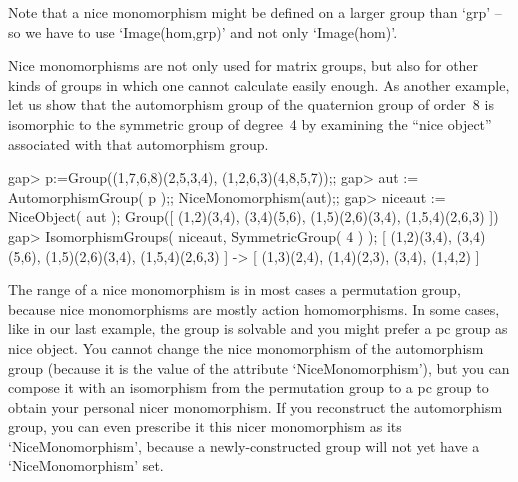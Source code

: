 Note that a nice monomorphism might be defined on a larger group than `grp'
-- so we have to use `Image(hom,grp)' and not only `Image(hom)'.

%

Nice monomorphisms are not only used for matrix groups, but also for
other kinds of groups in which one cannot calculate easily enough. As
another example, let us show that the automorphism group of the
quaternion group of order~8 is isomorphic to the symmetric group of
degree~4  by examining the ``nice object'' associated with that
automorphism group.

\beginexample
gap> p:=Group((1,7,6,8)(2,5,3,4), (1,2,6,3)(4,8,5,7));;
gap> aut := AutomorphismGroup( p );; NiceMonomorphism(aut);;
gap> niceaut := NiceObject( aut );
Group([ (1,2)(3,4), (3,4)(5,6), (1,5)(2,6)(3,4), (1,5,4)(2,6,3) ])
gap> IsomorphismGroups( niceaut, SymmetricGroup( 4 ) );
[ (1,2)(3,4), (3,4)(5,6), (1,5)(2,6)(3,4), (1,5,4)(2,6,3) ] -> 
[ (1,3)(2,4), (1,4)(2,3), (3,4), (1,4,2) ]
\endexample

%

The range of  a nice monomorphism is  in most cases a permutation  group,
because  nice monomorphisms  are mostly action  homomorphisms. In some
cases,  like in  our last example,  the  group is solvable  and you might
prefer a pc group as nice object. You cannot change the nice monomorphism
of  the automorphism  group (because it  is   the value  of the attribute
`NiceMonomorphism'), but you can compose  it with an isomorphism from the
permutation  group to  a  pc   group  to   obtain your  personal    nicer
monomorphism. If  you reconstruct  the automorphism  group,  you can even
prescribe it this nicer monomorphism as its `NiceMonomorphism', because a
newly-constructed group will not yet have a `NiceMonomorphism' set.

